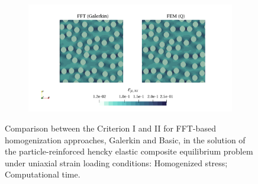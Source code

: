 \begin{figure}[hbt]
\begin{subfigure}[b]{0.49\textwidth}
    \caption{}
    \label{subfig:hencky_2D_normal_cpu_time_vs_n_voxels}
  \end{subfigure}
  \begin{subfigure}[b]{\textwidth}
    \centering
    \includegraphics[width=\textwidth]{figures/hencky_2D_normal_strain_11}
    \caption{}
    \label{subfig:hencky_2D_normal_strain_11}
  \end{subfigure}

\caption{Comparison between the Criterion I and II for FFT-based homogenization approaches, Galerkin and Basic, in the
solution of the particle-reinforced hencky elastic composite equilibrium problem under uniaxial
strain loading conditions:  Homogenized stress;  Computational time.}
\label{fig:hencky_2D_shear_comparison_crit}
\end{figure}

